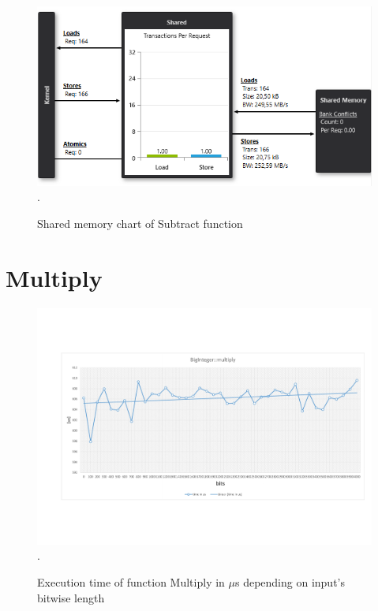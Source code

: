 \documentclass[oneside,openright,12pt,final,en]{mgr}
\begin{document}
\begin{figure}[H]
	\centering
	\includegraphics[width=\textwidth]{subtract_shared}.
	\caption{Shared memory chart of Subtract function}
	\label{fig:subtract_shared}
\end{figure}

\section{Multiply}

\begin{figure}[H]
	\centering
	\includegraphics[width=\textwidth,trim={0.5cm 2.8cm 0.4cm 2.8cm},clip]{multiply.pdf}.
	\caption{Execution time of function Multiply in $\mu$s depending on input's bitwise length}
	\label{fig:multiply}
\end{figure}
\end{document}
